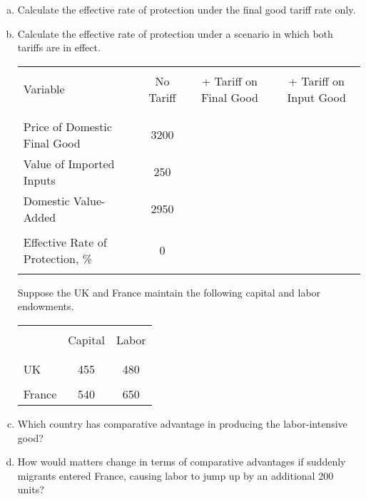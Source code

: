 \documentclass[12pt]{article}
\begin{document}
\begin{enumerate}[a)]
	
	\item Calculate the effective rate of protection under the final good tariff rate only.
	
		\vspace{2in}
	
	\item Calculate the effective rate of protection under a scenario in which both tariffs are in effect.
	
	\vspace{2in}

	\begin{table}[!h]
		\centering
		\begin{tabular}[t]{l c c c}
			\hline
			&&&\\
			Variable & No Tariff & + Tariff on Final Good & + Tariff on Input Good \\
			&&&\\
			\hline
			&&&\\
			Price of Domestic Final Good & 3200 & & \\
			Value of Imported Inputs & 250 & & \\
			Domestic Value-Added &	2950	&&\\
			&&&\\
			Effective Rate of Protection, \% &	0	&& \\
			&&&\\
			\hline
		\end{tabular}
	\end{table}

	\newpage
	
Suppose the UK and France maintain the following capital and labor endowments.
\begin{table}[!h]
	\centering
	\begin{tabular}[t]{l c c }
		\hline
		&&\\
		 & Capital & Labor \\
		&&\\
		\hline
		&&\\
		UK & 455 & 480 \\
		&&\\
		France & 540 & 650 \\
		\hline
	\end{tabular}
\end{table}

\item Which country has comparative advantage in producing the labor-intensive good?

\vspace{2in}
 
\item How would matters change in terms of comparative advantages if suddenly migrants entered France, causing labor to jump up by an additional 200 units?

\end{enumerate}
\end{document}
